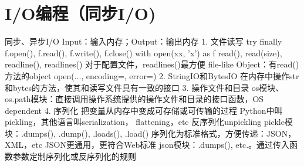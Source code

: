 \documentclass{report}
\begin{document}
\section{I/O编程（同步I/O)}
同步、异步I/O
Input：输入内存；Output：输出内存 
1. 文件读写 
   try finally
   f.open(), f.read(), f.write(), f.close()  
   with open(xx, 'x') as f 
   read(), read(size), readline(), readlines()
   对于配置文件，readlines()最方便 
   file-like Object：有read()方法的object 
   open(..., encoding=, error=)
2. StringIO和BytesIO 
   在内存中操作str和bytes的方法，使其和读写文件具有一致的接口
3. 操作文件和目录
   os模块、os.path模块：直接调用操作系统提供的操作文件和目录的接口函数，OS dependent 
4. 序列化
   把变量从内存中变成可存储或可传输的过程 
   Python中叫pickling，其他语言叫serialization， flattening，etc
   反序列化unpickling 
   pickle模块：.dumps(), .dump(), .loads(), .load()
   序列化为标准格式，方便传递：JSON，XML，etc 
   JSON更通用，更符合Web标准
   json模块：.dumps(), etc.。通过传入函数参数定制序列化或反序列化的规则
\end{document}
